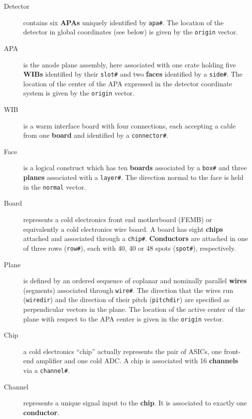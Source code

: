 \documentclass[pdftex,12pt,letter]{article}
\begin{document}
\begin{description}

\item[Detector] contains six \textbf{APAs} uniquely identified by
  \texttt{apa\#}.  The location of the detector in global coordinates
  (see below) is given by the \texttt{origin} vector.

\item[APA] is the anode plane assembly, here associated with one crate
  holding five \textbf{WIBs} identified by their \texttt{slot\#} and two
  \textbf{faces} identified by a \texttt{side\#}.  The location of the
  center of the APA expressed in the detector coordinate system is
  given by the \texttt{origin} vector.

\item[WIB] is a warm interface board with four connections, each
  accepting a cable from one \textbf{board} and identified by a
  \texttt{connector\#}.

\item[Face] is a logical construct which has ten \textbf{boards} associated by a
  \texttt{box\#} and three \textbf{planes} associated with a \texttt{layer\#}.
  The direction normal to the face is held in the \texttt{normal}
  vector.

\item[Board] represents a cold electronics front end motherboard
  (FEMB) or equivalently a cold electronics wire board.  A board has eight \textbf{chips}
  attached and associated through a \texttt{chip\#}.  \textbf{Conductors} are
  attached in one of three rows (\texttt{row\#}), each with 40, 40 or
  48 spots (\texttt{spot\#}), respectively.

\item[Plane] is defined by an ordered sequence of coplanar and
  nominally parallel \textbf{wires} (segments) associated through
  \texttt{wire\#}.  The direction that the wires run
  (\texttt{wiredir}) and the direction of their pitch
  (\texttt{pitchdir}) are specified as perpendicular vectors in the
  plane.  The location of the active center of the plane with respect
  to the APA center is given in the \texttt{origin} vector.

\item[Chip] a cold electronics ``chip'' actually represents the pair
  of ASICs, one front-end amplifier and one cold ADC.  A chip is
  associated with 16 \textbf{channels} via a \texttt{channel\#}.

\item[Channel] represents a unique signal input to the \textbf{chip}.  It is
  associated to exactly one \textbf{conductor}.


\end{description}
\end{document}
